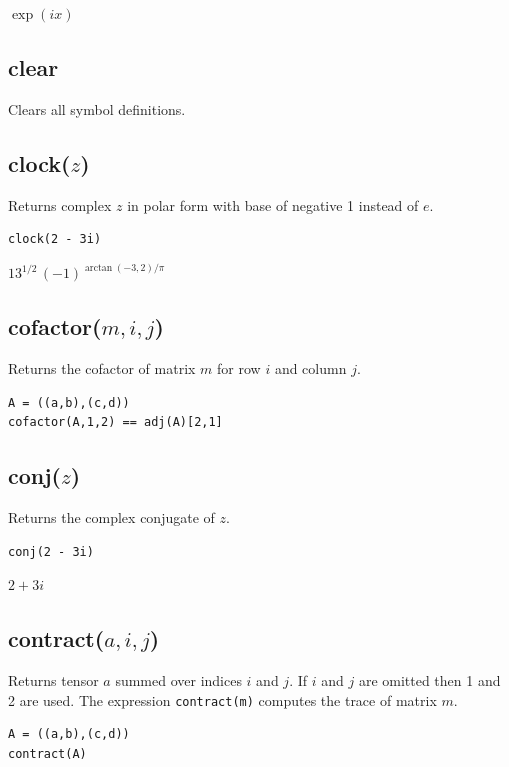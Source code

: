 \documentclass[12pt]{article}
\begin{document}
\noindent
$\exp(ix)$

\subsection*{clear}

Clears all symbol definitions.

\subsection*{clock($z$)}

Returns complex $z$ in polar form with base of negative 1 instead of $e$.

{\color{blue}
\begin{verbatim}
clock(2 - 3i)
\end{verbatim}
}

\noindent
$13^{1/2}\,(-1)^{\arctan(-3,2)/\pi}$

\subsection*{cofactor($m,i,j$)}

Returns the cofactor of matrix $m$ for row $i$ and column $j$.

{\color{blue}
\begin{verbatim}
A = ((a,b),(c,d))
cofactor(A,1,2) == adj(A)[2,1]
\end{verbatim}
}


\subsection*{conj($z$)}

Returns the complex conjugate of $z$.

{\color{blue}
\begin{verbatim}
conj(2 - 3i)
\end{verbatim}
}

\noindent
$2 + 3 i$

\subsection*{contract($a,i,j$)}

Returns tensor $a$ summed over indices $i$ and $j$.
If $i$ and $j$ are omitted then 1 and 2 are used.
The expression {\tt contract(m)} computes the trace of matrix $m$.

{\color{blue}
\begin{verbatim}
A = ((a,b),(c,d))
contract(A)
\end{verbatim}
}
\end{document}
